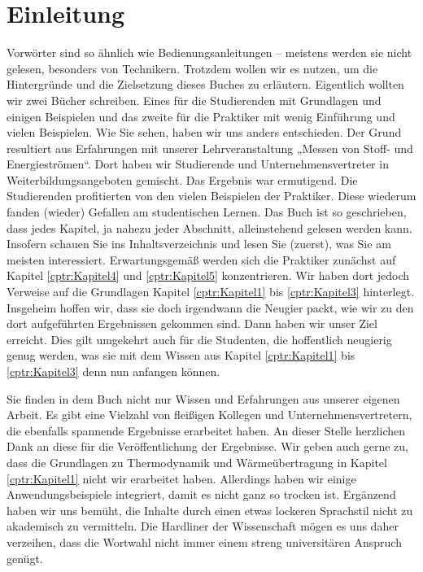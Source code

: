 \chapter{Einleitung}
\label{cptr:Einleitung}
Vorwörter sind so ähnlich wie Bedienungsanleitungen – meistens werden sie nicht gelesen, besonders von Technikern. Trotzdem wollen wir es nutzen, um die Hintergründe und die Zielsetzung dieses Buches zu erläutern. Eigentlich wollten wir zwei Bücher schreiben. Eines für die Studierenden mit Grundlagen und einigen Beispielen und das zweite für die Praktiker mit wenig Einführung und vielen Beispielen. Wie Sie sehen, haben wir uns anders entschieden. Der Grund resultiert aus Erfahrungen mit unserer Lehrveranstaltung „Messen von Stoff- und Energieströmen“. Dort haben wir Studierende und Unternehmensvertreter in Weiterbildungsangeboten gemischt. Das Ergebnis war ermutigend. Die Studierenden profitierten von den vielen Beispielen der Praktiker. Diese wiederum fanden (wieder) Gefallen am studentischen Lernen. Das Buch ist so geschrieben, dass jedes Kapitel, ja nahezu jeder Abschnitt, alleinstehend gelesen werden kann. Insofern schauen Sie ins Inhaltsverzeichnis und lesen Sie (zuerst), was Sie am meisten interessiert. Erwartungsgemäß werden sich die Praktiker zunächst auf Kapitel \ref{cptr:Kapitel4} und \ref{cptr:Kapitel5} konzentrieren. Wir haben dort jedoch Verweise auf die Grundlagen Kapitel \ref{cptr:Kapitel1} bis \ref{cptr:Kapitel3} hinterlegt. Insgeheim hoffen wir, dass sie doch irgendwann die Neugier packt, wie wir zu den dort aufgeführten Ergebnissen gekommen sind. Dann haben wir unser Ziel erreicht. Dies gilt umgekehrt auch für die Studenten, die hoffentlich neugierig genug werden, was sie mit dem Wissen aus Kapitel \ref{cptr:Kapitel1} bis \ref{cptr:Kapitel3} denn nun anfangen können.\par\bigskip

Sie finden in dem Buch nicht nur Wissen und Erfahrungen aus unserer eigenen Arbeit. Es gibt eine Vielzahl von fleißigen Kollegen und Unternehmensvertretern, die ebenfalls spannende Ergebnisse erarbeitet haben. An dieser Stelle herzlichen Dank an diese für die Veröffentlichung der Ergebnisse. Wir geben auch gerne zu, dass die Grundlagen zu Thermodynamik und Wärmeübertragung in Kapitel \ref{cptr:Kapitel1} nicht wir erarbeitet haben. Allerdings haben wir einige Anwendungsbeispiele integriert, damit es nicht ganz so trocken ist. Ergänzend haben wir uns bemüht, die Inhalte durch einen etwas lockeren Sprachstil nicht zu akademisch zu vermitteln. Die Hardliner der Wissenschaft mögen es uns daher verzeihen, dass die Wortwahl nicht immer einem streng universitären Anspruch genügt.\par\bigskip

